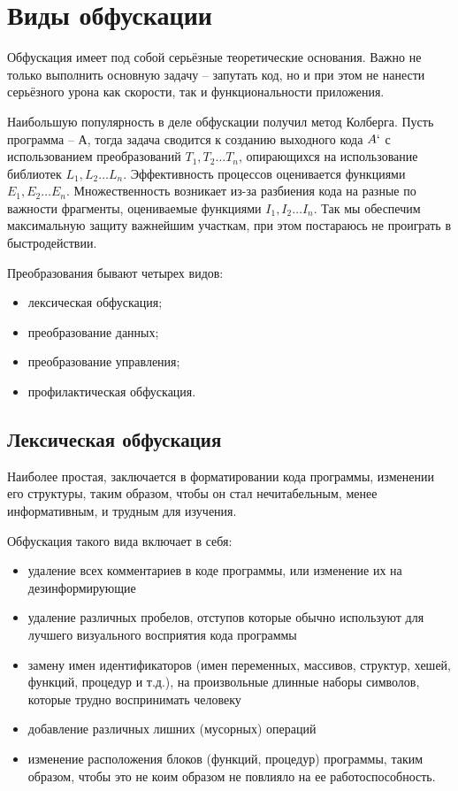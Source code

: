 \newpage
\section{Виды обфускации}

Обфускация имеет под собой серьёзные теоретические основания. Важно не только выполнить основную задачу -- запутать код, но и при этом не нанести серьёзного урона как скорости, так и функциональности приложения.

Наибольшую популярность в деле обфускации получил метод Колберга. Пусть программа -- А, тогда задача сводится к созданию выходного кода $A`$ с использованием преобразований $T_1, T_2 \dots T_n$, опирающихся на использование библиотек $L_1, L_2 \dots L_n$. Эффективность процессов оценивается функциями $E_1, E_2 \dots E_n$. Множественность возникает из-за разбиения кода на разные по важности фрагменты, оцениваемые функциями $I_1, I_2 \dots I_n$. Так мы обеспечим максимальную защиту важнейшим участкам, при этом постараюсь не проиграть в быстродействии.

Преобразования бывают четырех видов:

\begin{itemize}
\item лексическая обфускация;
\item преобразование данных;
\item преобразование управления;
\item профилактическая обфускация.
\end{itemize}

\subsection{Лексическая обфускация}

Наиболее простая, заключается в форматировании кода программы, изменении его структуры, таким образом, чтобы он стал нечитабельным, менее информативным, и трудным для изучения.

Обфускация такого вида включает в себя:
\begin{itemize}
\item удаление всех комментариев в коде программы, или изменение их на дезинформирующие
\item удаление различных пробелов, отступов которые обычно используют для лучшего визуального восприятия кода программы
\item замену имен идентификаторов (имен переменных, массивов, структур, хешей, функций, процедур и т.д.), на произвольные длинные наборы символов, которые трудно воспринимать человеку
\item добавление различных лишних (мусорных) операций
\item изменение расположения блоков (функций, процедур) программы, таким образом, чтобы это не коим образом не повлияло на ее работоспособность.
\end{itemize}

